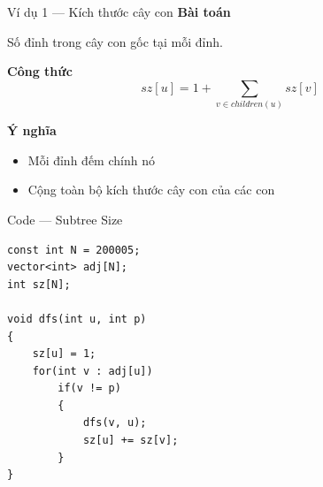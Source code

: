 \documentclass[aspectratio=169]{beamer}
\begin{document}
\begin{frame}{Ví dụ 1 — Kích thước cây con}
\textbf{Bài toán}

Số đỉnh trong cây con gốc tại mỗi đỉnh.

\vspace{6pt}
\textbf{Công thức}
\[
sz[u] = 1 + \sum_{v \in children(u)} sz[v]
\]

\vspace{6pt}
\textbf{Ý nghĩa}
\begin{itemize}
    \item Mỗi đỉnh đếm chính nó
    \item Cộng toàn bộ kích thước cây con của các con
\end{itemize}
\end{frame}

\begin{frame}[fragile]{Code — Subtree Size}
\small
\begin{verbatim}
const int N = 200005;
vector<int> adj[N];
int sz[N];

void dfs(int u, int p)
{
    sz[u] = 1;
    for(int v : adj[u])
        if(v != p)
        {
            dfs(v, u);
            sz[u] += sz[v];
        }
}
\end{verbatim}
\end{frame}
\end{document}
